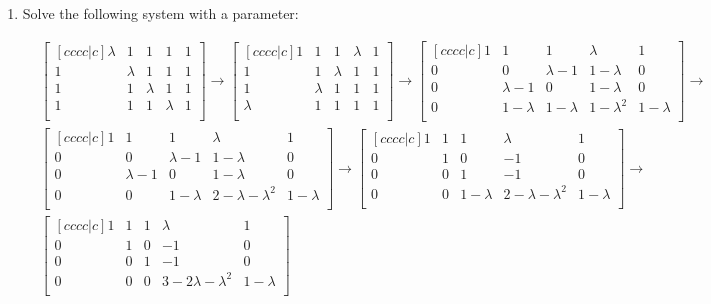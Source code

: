 \documentclass{article}
\begin{document}
\begin{enumerate}
\newpage
\item Solve the following system with a parameter:

\begin{align*}
&\begin{bmatrix}[cccc|c]
\lambda & 1 & 1 & 1 & 1\\
1 & \lambda & 1 & 1 & 1\\
1 & 1 & \lambda & 1 & 1\\
1 & 1 & 1 & \lambda & 1\\
\end{bmatrix}
\to
\begin{bmatrix}[cccc|c]
1 & 1 & 1 & \lambda & 1\\
1 & 1 & \lambda & 1 & 1\\
1 & \lambda & 1 & 1 & 1\\
\lambda & 1 & 1 & 1 & 1\\
\end{bmatrix}
\to
\begin{bmatrix}[cccc|c]
1 & 1 & 1 & \lambda & 1\\
0 & 0 & \lambda - 1 & 1 - \lambda & 0\\
0 & \lambda - 1 & 0 & 1 -\lambda  & 0\\
0 & 1 - \lambda & 1 - \lambda & 1 -\lambda^2 & 1-\lambda\\
\end{bmatrix}
\to\\
&\begin{bmatrix}[cccc|c]
1 & 1 & 1 & \lambda & 1\\
0 & 0 & \lambda - 1 & 1 - \lambda & 0\\
0 & \lambda - 1 & 0 & 1 -\lambda  & 0\\
0 & 0 & 1 - \lambda & 2 - \lambda - \lambda^2 & 1-\lambda\\
\end{bmatrix}
\to
\begin{bmatrix}[cccc|c]
1 & 1 & 1 & \lambda & 1\\
0 & 1 & 0 & -1 & 0\\
0 & 0 & 1 & -1 & 0\\
0 & 0 & 1 - \lambda & 2 - \lambda - \lambda^2 & 1-\lambda\\
\end{bmatrix}
\to\\
&\begin{bmatrix}[cccc|c]
1 & 1 & 1 & \lambda & 1\\
0 & 1 & 0 & -1 & 0\\
0 & 0 & 1 & -1 & 0\\
0 & 0 & 0 & 3 - 2\lambda - \lambda^2 & 1-\lambda\\
\end{bmatrix}\\
\end{align*}


\end{enumerate}
\end{document}
